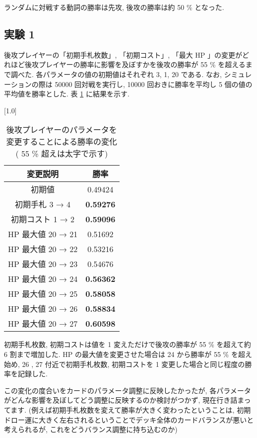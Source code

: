 \documentclass{jarticle}     %
\begin{document}
ランダムに対戦する動詞の勝率は先攻, 後攻の勝率は約 50 \% となった.
\subsection{実験 1 }
後攻プレイヤーの「初期手札枚数」, 「初期コスト」, 「最大 HP 」の変更がどれほど後攻プレイヤーの勝率に影響を及ぼすかを後攻の勝率が 55 \% を超えるまで調べた. 各パラメータの値の初期値はそれぞれ 3, 1, 20 である. なお, シミュレーションの際は 50000 回対戦を実行し, 10000 回おきに勝率を平均し 5 個の値の平均値を勝率とした.
表 \ref{table:paramresult1} に結果を示す.

\begin{table}[ht]
        \centering
        \caption{後攻プレイヤーのパラメータを変更することによる勝率の変化 ( 55 \% 超えは太字で示す)}
        \vspace{-0.3cm}
        \label{table:paramresult1}
        \scalebox{1.0}[1.0]{
          \begin{tabular}{|c|c|}
            \hline
            変更説明 & 勝率 \\ \hline
            初期値 & 0.49424 \\ \hline
            初期手札 3 → 4 & \textbf{0.59276} \\ \hline
            初期コスト 1 → 2 & \textbf{0.59096} \\ \hline
            HP 最大値 20 → 21 & 0.51692 \\ \hline
            HP 最大値 20 → 22 & 0.53216 \\ \hline
            HP 最大値 20 → 23 & 0.54676 \\ \hline
            HP 最大値 20 → 24 & \textbf{0.56362} \\ \hline
            HP 最大値 20 → 25 & \textbf{0.58058} \\ \hline
            HP 最大値 20 → 26 & \textbf{0.58834} \\ \hline
            HP 最大値 20 → 27 & \textbf{0.60598} \\ \hline
            \end{tabular}
        }
        \end{table}

初期手札枚数, 初期コストは値を 1 変えただけで後攻の勝率が 55 \% を超えて約 6 割まで増加した. HP の最大値を変更させた場合は 24 から勝率が 55 \% を超え始め, 26 , 27 付近で初期手札枚数, 初期コストを 1 変更した場合と同じ程度の勝率を記録した. \par
この変化の度合いをカードのパラメータ調整に反映したかったが, 各パラメータがどんな影響を及ぼしてどう調整に反映するのか検討がつかず, 現在行き詰まってます. (例えば初期手札枚数を変えて勝率が大きく変わったということは, 初期ドロー運に大きく左右されるということでデッキ全体のカードバランスが悪いと考えられるが, これをどうバランス調整に持ち込むのか)
\end{document}
